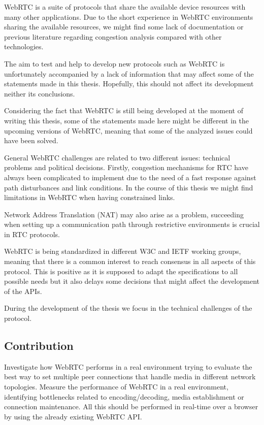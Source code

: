 WebRTC is a suite of protocols that share the available device resources with many other applications. Due to the short experience in WebRTC environments sharing the available resources, we might find some lack of documentation or previous literature regarding congestion analysis compared with other technologies. 

The aim to test and help to develop new protocols such as WebRTC is unfortunately accompanied by a lack of information that may affect some of the statements made in this thesis. Hopefully, this should not affect its development neither its conclusions.

Considering the fact that WebRTC is still being developed at the moment of writing this thesis, some of the statements made here might be different in the upcoming versions of WebRTC, meaning that some of the analyzed issues could have been solved.

General WebRTC challenges are related to two different issues: technical problems and political decisions. Firstly, congestion mechanisms for RTC have always been  complicated to implement due to the need of a fast response against path disturbances and link conditions. In the course of this thesis we might find limitations in WebRTC when having constrained links.

Network Address Translation (NAT)  may also arise as a problem, succeeding when setting up a communication path through restrictive environments is crucial in RTC protocols.

WebRTC is being standardized in different W3C and IETF working groups, meaning that there is a common interest to reach consensus in all aspects of this protocol. This is positive as it is supposed to adapt the specifications to all possible needs but it also delays some decisions that might affect the development of the APIs.

During the development of the thesis we focus in the technical challenges of the protocol.

\subsection{Contribution}

Investigate how WebRTC performs in a real environment trying to evaluate the best way to set multiple peer connections that handle media in different network topologies. Measure the performance of WebRTC in a real environment, identifying bottlenecks related to encoding/decoding, media establishment or connection maintenance. All this should be performed in real-time over a browser by using the already existing WebRTC API.

